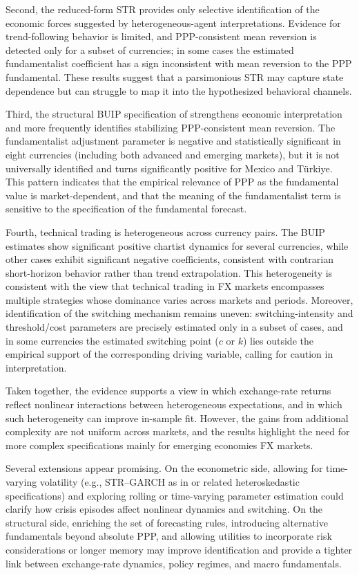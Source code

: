 \documentclass[a4paper,10pt,final]{article}    %
\begin{document}
Second, the reduced-form STR provides only selective identification of the economic forces suggested by heterogeneous-agent interpretations. Evidence for trend-following behavior is limited, and PPP-consistent mean reversion is detected only for a subset of currencies; in some cases the estimated fundamentalist coefficient has a sign inconsistent with mean reversion to the PPP fundamental. These results suggest that a parsimonious STR may capture state dependence but can struggle to map it into the hypothesized behavioral channels.

Third, the structural BUIP specification of \citet{Proano2011,proano2013monetary} strengthens economic interpretation and more frequently identifies stabilizing PPP-consistent mean reversion. The fundamentalist adjustment parameter is negative and statistically significant in eight currencies (including both advanced and emerging markets), but it is not universally identified and turns significantly positive for Mexico and T\"urkiye. This pattern indicates that the empirical relevance of PPP as the fundamental value is market-dependent, and that the meaning of the fundamentalist term is sensitive to the specification of the fundamental forecast.

Fourth, technical trading is heterogeneous across currency pairs. The BUIP estimates show significant positive chartist dynamics for several currencies, while other cases exhibit significant negative coefficients, consistent with contrarian short-horizon behavior rather than trend extrapolation. This heterogeneity is consistent with the view that technical trading in FX markets encompasses multiple strategies whose dominance varies across markets and periods. Moreover, identification of the switching mechanism remains uneven: switching-intensity and threshold/cost parameters are precisely estimated only in a subset of cases, and in some currencies the estimated switching point ($c$ or $k$) lies outside the empirical support of the corresponding driving variable, calling for caution in interpretation.

Taken together, the evidence supports a view in which exchange-rate returns reflect nonlinear interactions between heterogeneous expectations, and in which such heterogeneity can improve in-sample fit. However, the gains from additional complexity are not uniform across markets, and the results highlight the need for more complex specifications mainly for emerging economies FX markets.

Several extensions appear promising. On the econometric side, allowing for time-varying volatility (e.g., STR--GARCH as in \citet{WesterhoffReitz2003,reitz2007commodity} or related heteroskedastic specifications) and exploring rolling or time-varying parameter estimation could clarify how crisis episodes affect nonlinear dynamics and switching. On the structural side, enriching the set of forecasting rules, introducing alternative fundamentals beyond absolute PPP, and allowing utilities to incorporate risk considerations or longer memory may improve identification and provide a tighter link between exchange-rate dynamics, policy regimes, and macro fundamentals.
\end{document}
